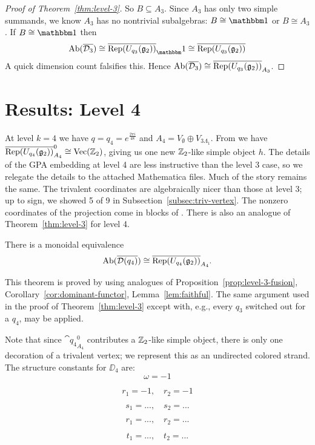 \begin{proof}[Proof of Theorem~\ref{thm:level-3}]
    So $B\subseteq A_3$. Since $A_3$ has only two simple summands, we know $A_3$ has no nontrivial subalgebras: $B\cong \unit$ or $B\cong A_3$.
    If $B\cong \unit$ then
    \[
        \Ab(\ol{\DD_3}) \cong \ol{\Rep(U_{q_3}(\gg_2))}_\unit \cong \ol{\Rep(U_{q_3}(\gg_2))}
    \]
    A quick dimension count falsifies this. Hence $\operatorname{Ab}(\overline{\mathcal{D}_3}) \cong \overline{ \operatorname{Rep}(U_{q_3}(\mathfrak{g}_2))}_{A_3}$.
\end{proof}








\section{Results: Level 4}
At level $k=4$ we have $q = q_4 = e^{\frac{2\pi i}{48}}$ and 
$A_4=V_\emptyset \oplus V_{3\Lambda_1}$. 
From \cite{DMNO} we have $\overline{\operatorname{Rep}(U_{q_4}(\mathfrak{g}_2))}_{A_4}^0 \cong \operatorname{Vec}(\mathbb{Z}_2)$, giving us one new 
$\mathbb{Z}_2$-like simple object $h$. 
The details of the GPA embedding at level 4 are less instructive than the level 3 case, 
so we relegate the details to the attached Mathematica files. 
Much of the story remains the same. 
The trivalent coordinates are algebraically nicer than those at level 3; 
up to sign, we showed 5 of 9 in Subsection~\ref{subsec:triv-vertex}. 
The nonzero coordinates of the projection come in blocks of . 
There is also an analogue of Theorem~\ref{thm:level-3} for level 4.

\begin{theorem}\label{thm:level-4}
    There is a monoidal equivalence
    \[
        \operatorname{Ab}(\overline{\mathcal{D}(q_4)}) \cong \overline{ \operatorname{Rep}(U_{q_4}(\mathfrak{g}_2))}_{A_4}.
    \]
\end{theorem}

This theorem is proved by using analogues of Proposition~\ref{prop:level-3-fusion}, Corollary~\ref{cor:dominant-functor}, Lemma~\ref{lem:faithful}.
The same argument used in the proof of Theorem~\ref{thm:level-3} except with, e.g., every $q_3$ switched out for a $q_4$, may be applied.

Note that since $\cat{q_4}_{A_4}^0$ contributes a $\mathbb{Z}_2$-like simple object, there is only one decoration of a trivalent vertex;
we represent this as an undirected colored strand.
The structure constants for $\DD_4$ are:
\begin{equation*}
    \omega = -1
\end{equation*}

\begin{equation*}
    r_1 = -1, \quad r_2 = -1
\end{equation*}

\begin{equation*}
    s_1 = ..., \quad s_2 = ...
\end{equation*}

\begin{equation*}
    r_1 = ..., \quad r_2 = ...
\end{equation*}

\begin{equation*}
    t_1 = ..., \quad t_2 = ...
\end{equation*}


